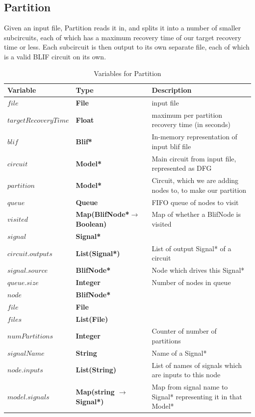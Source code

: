 \documentclass[12pt,final,oneside]{dwThesis} %
\begin{document}
   \subsection{Partition}\label{algPartition}
   Given an input file, Partition reads it in, and splits it into a number of smaller subcircuits, each of which has a maximum recovery time of our target recovery time or less. Each subcircuit is then output to its own separate file, each of which is a valid \gls{BLIF} circuit on its own.
   \begin{table}
      \begin{center}
         \begin{tabularx}{\linewidth}{llX}
            \toprule
            Variable & Type & Description\\
            \midrule
            $file$ &\textbf{ File  } &  input file\\
            $targetRecoveryTime$ &\textbf{ Float } &  maximum per partition recovery time (in seconds)\\
            $blif$ &\textbf{  Blif* } &  In-memory representation of input blif file\\
            $circuit$ &\textbf{   Model* } &  Main circuit from input file, represented as DFG\\
            $partition$ &\textbf{   Model* } &  Circuit, which we are adding nodes to, to make our partition\\
            $queue$ &\textbf{  Queue } &  FIFO queue of nodes to visit\\
            $visited$ &\textbf{   Map(BlifNode*$\to$ Boolean)} &  Map of whether a BlifNode is visited\\
            $signal$ &\textbf{  Signal* } &  \\
            $circuit.outputs$ &\textbf{  List(Signal*) } &  List of output Signal* of a circuit\\
            $signal.source$ &\textbf{  BlifNode* } &  Node which drives this Signal*\\
            $queue.size$ &\textbf{ Integer } &  Number of nodes in queue\\
            $node$ &\textbf{  BlifNode* } &  \\
            $file$ &\textbf{  File } &  \\
            $files$ &\textbf{  List(File) } &  \\
            $numPartitions$ &\textbf{ Integer } &  Counter of number of partitions\\
            $signalName$ &\textbf{ String } &  Name of a Signal*\\
            $node.inputs$ &\textbf{  List(String) } &  List of names of signals which are inputs to this node\\
            $model.signals$ &\textbf{  Map(string $\to$ Signal*) } &  Map from signal name to Signal* representing it in that Model*\\
            \bottomrule
         \end{tabularx}
         \caption{Variables for Partition}
         \label{varPart}
      \end{center}
   \end{table}
\end{document}
